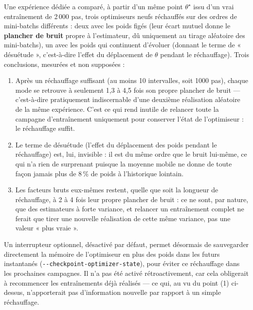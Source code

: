 \documentclass[11pt,a4paper]{article}
\begin{document}
\begin{mesure}
Une expérience dédiée a comparé, à partir d'un même point $\theta^\star$ issu d'un vrai
entraînement de 2\,000 pas, trois optimiseurs neufs réchauffés sur des ordres de mini-batchs
différents : deux avec les poids figés (leur écart mutuel donne le \textbf{plancher de bruit}
propre à l'estimateur, dû uniquement au tirage aléatoire des mini-batchs), un avec les poids qui
continuent d'évoluer (donnant le terme de « désuétude », c'est-à-dire l'effet du déplacement de
$\theta$ pendant le réchauffage). Trois conclusions, mesurées et non supposées :
\begin{enumerate}[leftmargin=1.3em]
\item Après un réchauffage suffisant (au moins 10 intervalles, soit 1000 pas), chaque mode se
retrouve à seulement 1,3 à 4,5 fois son propre plancher de bruit — c'est-à-dire pratiquement
indiscernable d'une deuxième réalisation aléatoire de la même expérience. C'est ce qui rend inutile
de relancer toute la campagne d'entraînement uniquement pour conserver l'état de l'optimiseur : le
réchauffage suffit.
\item Le terme de désuétude (l'effet du déplacement des poids pendant le réchauffage) est,
lui, invisible : il est du même ordre que le bruit lui-même, ce qui n'a rien de surprenant puisque
la moyenne mobile ne donne de toute façon jamais plus de 8\,\% de poids à l'historique lointain.
\item Les facteurs bruts eux-mêmes restent, quelle que soit la longueur de réchauffage, à 2 à 4
fois leur propre plancher de bruit : ce ne sont, par nature, que des estimateurs à forte variance,
et relancer un entraînement complet ne ferait que tirer une nouvelle réalisation de cette même
variance, pas une valeur « plus vraie ».
\end{enumerate}
\end{mesure}

Un interrupteur optionnel, désactivé par défaut, permet désormais de sauvegarder directement la
mémoire de l'optimiseur en plus des poids dans les futurs instantanés
(\texttt{-{}-checkpoint-optimizer-state}), pour éviter ce réchauffage dans les prochaines campagnes.
Il n'a pas été activé rétroactivement, car cela obligerait à recommencer les entraînements déjà
réalisés — ce qui, au vu du point (1) ci-dessus, n'apporterait pas d'information nouvelle par
rapport à un simple réchauffage.

\end{document}
